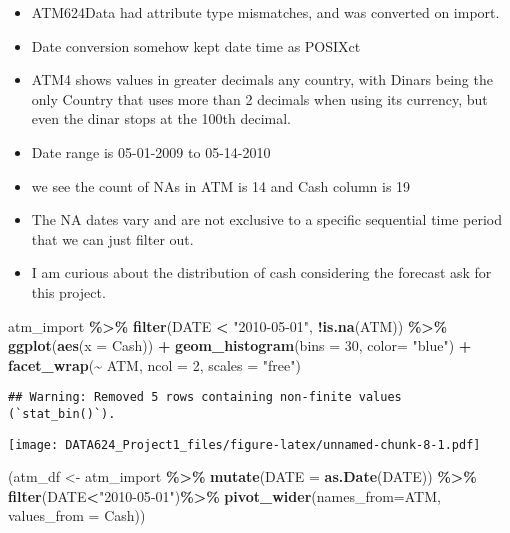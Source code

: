 \documentclass[
]{article}
\newenvironment{Shaded}{\begin{snugshade}}{\end{snugshade}}
\newcommand{\AttributeTok}[1]{\textcolor[rgb]{0.13,0.29,0.53}{#1}}
\newcommand{\DecValTok}[1]{\textcolor[rgb]{0.00,0.00,0.81}{#1}}
\newcommand{\FunctionTok}[1]{\textcolor[rgb]{0.13,0.29,0.53}{\textbf{#1}}}
\newcommand{\NormalTok}[1]{#1}
\newcommand{\OtherTok}[1]{\textcolor[rgb]{0.56,0.35,0.01}{#1}}
\newcommand{\SpecialCharTok}[1]{\textcolor[rgb]{0.81,0.36,0.00}{\textbf{#1}}}
\newcommand{\StringTok}[1]{\textcolor[rgb]{0.31,0.60,0.02}{#1}}
\providecommand{\tightlist}{%
  \setlength{\itemsep}{0pt}\setlength{\parskip}{0pt}}
\begin{document}
\begin{itemize}
\tightlist
\item
  ATM624Data had attribute type mismatches, and was converted on import.
\item
  Date conversion somehow kept date time as POSIXct
\item
  ATM4 shows values in greater decimals any country, with Dinars being
  the only Country that uses more than 2 decimals when using its
  currency, but even the dinar stops at the 100th decimal.
\item
  Date range is 05-01-2009 to 05-14-2010
\item
  we see the count of NAs in ATM is 14 and Cash column is 19
\item
  The NA dates vary and are not exclusive to a specific sequential time
  period that we can just filter out.
\item
  I am curious about the distribution of cash considering the forecast
  ask for this project.
\end{itemize}

\begin{Shaded}
\begin{Highlighting}[]
\NormalTok{atm\_import }\SpecialCharTok{\%\textgreater{}\%} 
  \FunctionTok{filter}\NormalTok{(DATE }\SpecialCharTok{\textless{}} \StringTok{"2010{-}05{-}01"}\NormalTok{, }\SpecialCharTok{!}\FunctionTok{is.na}\NormalTok{(ATM)) }\SpecialCharTok{\%\textgreater{}\%} 
  \FunctionTok{ggplot}\NormalTok{(}\FunctionTok{aes}\NormalTok{(}\AttributeTok{x =}\NormalTok{ Cash)) }\SpecialCharTok{+}
    \FunctionTok{geom\_histogram}\NormalTok{(}\AttributeTok{bins =} \DecValTok{30}\NormalTok{, }\AttributeTok{color=} \StringTok{"blue"}\NormalTok{) }\SpecialCharTok{+}
    \FunctionTok{facet\_wrap}\NormalTok{(}\SpecialCharTok{\textasciitilde{}}\NormalTok{ ATM, }\AttributeTok{ncol =} \DecValTok{2}\NormalTok{, }\AttributeTok{scales =} \StringTok{"free"}\NormalTok{)}
\end{Highlighting}
\end{Shaded}

\begin{verbatim}
## Warning: Removed 5 rows containing non-finite values (`stat_bin()`).
\end{verbatim}

\texttt{[image: DATA624\_Project1\_files/figure-latex/unnamed-chunk-8-1.pdf]}

\begin{Shaded}
\begin{Highlighting}[]
\NormalTok{(atm\_df }\OtherTok{\textless{}{-}}\NormalTok{ atm\_import }\SpecialCharTok{\%\textgreater{}\%} 
  \FunctionTok{mutate}\NormalTok{(}\AttributeTok{DATE =} \FunctionTok{as.Date}\NormalTok{(DATE)) }\SpecialCharTok{\%\textgreater{}\%}
   \FunctionTok{filter}\NormalTok{(DATE}\SpecialCharTok{\textless{}}\StringTok{"2010{-}05{-}01"}\NormalTok{)}\SpecialCharTok{\%\textgreater{}\%}
  \FunctionTok{pivot\_wider}\NormalTok{(}\AttributeTok{names\_from=}\NormalTok{ATM, }\AttributeTok{values\_from =}\NormalTok{ Cash))}
\end{Highlighting}
\end{Shaded}
\end{document}

